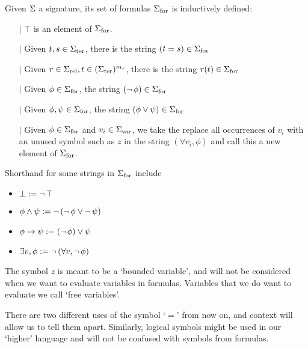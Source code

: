 \begin{dfn}
    Given $\Sigma$ a signature, 
    its set of formulas ${\Sigma}_\mathrm{for}$ is inductively defined:
    \begin{itemize}
        \item[$\vert$] $\top$ is an element of ${\Sigma}_\mathrm{for}$.
        \item[$\vert$] Given $t, s \in {\Sigma}_\mathrm{ter}$, 
        there is the string $(t = s) \in {\Sigma}_\mathrm{for}$
        \item[$\vert$] Given $r \in {\Sigma}_\mathrm{rel}, t \in ({\Sigma}_\mathrm{ter})^{m_r}$, 
        there is the string $r(t) \in {\Sigma}_\mathrm{for}$ \vspace{1em}
        \item[$\vert$] Given $\phi \in {\Sigma}_\mathrm{for}$, 
        the string $(\neg\, \phi) \in {\Sigma}_\mathrm{for}$ 
        \item[$\vert$] Given $\phi, \psi \in {\Sigma}_\mathrm{for}$, the string 
        $(\phi \lor \psi) \in {\Sigma}_\mathrm{for}$
        \item[$\vert$] Given $\phi \in {\Sigma}_\mathrm{for}$ 
        and $v_i \in {\Sigma}_\mathrm{var}$, we take the replace all occurrences of
        $v_i$ with an unused symbol such as $z$ in the string $(\forall v_i, \phi)$
        and call this a new element of ${\Sigma}_\mathrm{for}$.
    \end{itemize}
    Shorthand for some strings in ${\Sigma}_\mathrm{for}$ include 
    \begin{itemize}
        \item $\bot := \neg\, \top$
        \item $\phi \land \psi := \neg\,(\neg\,\phi \lor \neg\,\psi)$
        \item $\phi \to \psi := (\neg\,\phi) \lor \psi$
        \item $\exists v, \phi := \neg\,(\forall v, \neg\,\phi)$
    \end{itemize}
    
    The symbol $z$ is meant to be a `bounded variable', 
    and will not be considered when we want to evaluate
    variables in formulas.
    Variables that we do want to evaluate we call `free variables'.
\end{dfn}
\begin{rmk}
    There are two different uses of the symbol `$=$' from now on, 
    and context will allow us to tell them apart.
    Similarly, logical symbols might be used in our `higher' 
    language and will not be confused with symbols from formulas.
\end{rmk}

